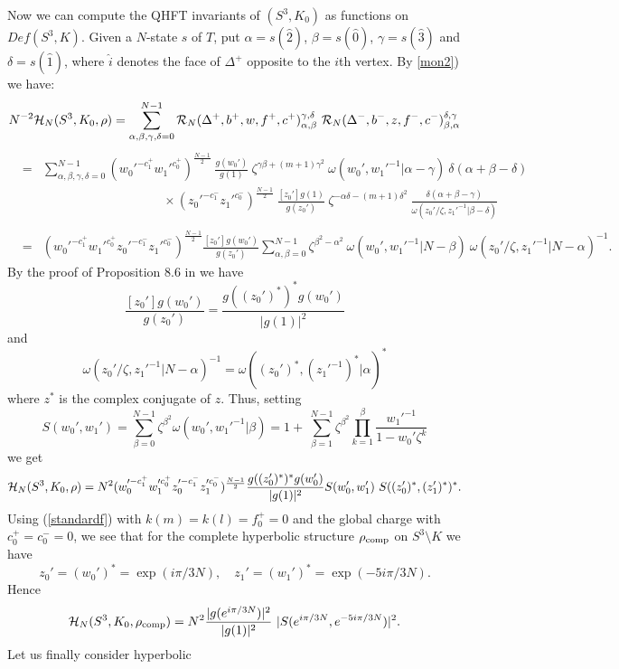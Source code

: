 Now we can compute the QHFT invariants of $(S^3,K_0)$ as functions on
$Def(S^3,K)$. Given a $N$-state $s$ of $T$, put $\alpha=s(\hat{2})$,
$\beta=s(\hat{0})$, $\gamma=s(\hat{3})$ and $\delta=s(\hat{1})$, where
$\hat{i}$ denotes the face of $\Delta ^+$ opposite to the $i$th
vertex. By \ref{mon2}) we have:
$$N^{-2}{\mathcal H}_N(S^3,K_0,\rho) = \sum_{\alpha,\beta,\gamma,\delta=0}^{N-1}
  {\mathcal R}_N(\Delta^+,b^+,w,f^+,c^+)_{\alpha,\beta}^{\gamma,\delta}\
  {\mathcal R}_N(\Delta^-,b^-,z,f^-,c^-)_{\beta,\alpha}^{\delta,\gamma}$$
$$\begin{array}{lll} & = & \sum_{\alpha,\beta,\gamma,\delta=0}^{N-1}
    (w_0'^{-c_1^+}w_1'^{c_0^+})^{\frac{N-1}{2}} \
    \frac{g(w_0')}{g(1)}\ \zeta^{\gamma\beta+(m+1)\gamma^2}\
    \omega(w_0',w_1'^{-1}\vert \alpha-\gamma) \ \delta(\alpha+\beta
    -\delta)\\ & & \hspace{4cm} \times
    (z_0'^{-c_1^-}z_1'^{c_0^-})^{\frac{N-1}{2}}\
    \frac{[z_0']g(1)}{g(z_0')}\ \zeta^{-\alpha\delta-(m+1)\delta^2}\
    \frac{\delta(\alpha+\beta
    -\gamma)}{\omega(z_0'/\zeta,z_1'^{-1}\vert \beta-\delta)} \\ \\ &
    = &
    (w_0'^{-c_1^+}w_1'^{c_0^+}z_0'^{-c_1^-}z_1'^{c_0^-})^{\frac{N-1}{2}}
    \frac{[z_0']g(w_0')}{g(z_0')} \sum_{\alpha,\beta=0}^{N-1}
    \zeta^{\beta^2-\alpha^2}\ \omega(w_0',w_1'^{-1}\vert N-\beta)\
    \omega(z_0'/\zeta,z_1'^{-1}\vert N-\alpha)^{-1}.
\end{array}$$
By the proof of Proposition 8.6 in \cite{BB2} we have
$$\frac{[z_0']g(w_0')}{g(z_0')} =
\frac{g((z_0')^*)^*g(w_0')}{|g(1)|^2}$$
and
$$\omega(z_0'/\zeta,z_1'^{-1}\vert N-\alpha)^{-1} =
\omega((z_0')^*,(z_1'^{-1})^*\vert \alpha)^*$$
where $z^*$ is the complex conjugate of $z$. Thus, setting
$$S(w_0',w_1') = \sum_{\beta=0}^{N-1} \zeta^{\beta^2}
\omega(w_0',w_1'^{-1}\vert \beta) = 1+\ \sum_{\beta=1}^{N-1}
\zeta^{\beta^2} \prod_{k=1}^{\beta} \frac{w_1'^{-1}}{1-w_0'\zeta^k}$$
we get
$${\mathcal H}_N(S^3,K_0,\rho) =
N^{2}(w_0'^{-c_1^+}w_1'^{c_0^+}z_0'^{-c_1^-}z_1'^{c_0^-})^{\frac{N-1}{2}}
\frac{g((z_0')^*)^*g(w_0')}{|g(1)|^2}S(w_0',w_1')
\ S((z_0')^*,(z_1')^*)^*.$$ Using (\ref{standardf}) with
$k(m)=k(l)=f_0^+=0$ and the global charge with $c_0^+=c_0^-=0$, we see
that for the complete hyperbolic structure $\rho_{\rm comp}$ on
$S^3\setminus K$ we have
$$z_0' = (w_0')^*= \exp(i\pi/3N),\quad z_1' = (w_1')^*=
\exp(-5i\pi/3N).$$ Hence $${\mathcal H}_N(S^3,K_0,\rho_{\rm comp})
=N^{2}\frac{|g(e^{i\pi/3N})|^2}{|g(1)|^2} \ |
S(e^{i\pi/3N},e^{-5i\pi/3N})|^2.$$ Let us finally consider hyperbolic
